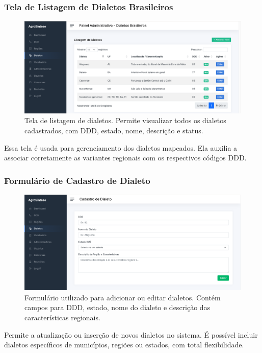 \subsubsection*{Tela de Listagem de Dialetos Brasileiros}

\begin{figure}[H]
	\centering
	\includegraphics[width=0.95\linewidth]{images/adm-dialetos-braileito-lista.png}
	\caption{Tela de listagem de dialetos. Permite visualizar todos os dialetos cadastrados, com DDD, estado, nome, descrição e status.}
\end{figure}

Essa tela é usada para gerenciamento dos dialetos mapeados. Ela auxilia a associar corretamente as variantes regionais com os respectivos códigos DDD.

\subsubsection*{Formulário de Cadastro de Dialeto}

\begin{figure}[H]
	\centering
	\includegraphics[width=0.95\linewidth]{images/adm-dialeto-form.png}
	\caption{Formulário utilizado para adicionar ou editar dialetos. Contém campos para DDD, estado, nome do dialeto e descrição das características regionais.}
\end{figure}

Permite a atualização ou inserção de novos dialetos no sistema. É possível incluir dialetos específicos de municípios, regiões ou estados, com total flexibilidade.


